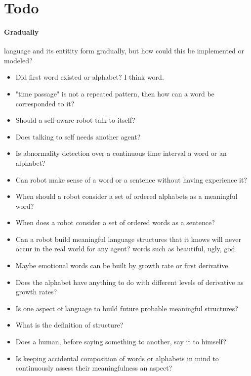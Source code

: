 \section{Todo}

    \paragraph{Gradually}
        language and its entitity form gradually, but how could this be implemented or modeled?


    \begin{itemize}
        \item Did first word existed or alphabet? I think word.
        \item "time passage" is not a repeated pattern, then how can a word be corresponded to it?
        \item Should a self-aware robot talk to itself?
        \item Does talking to self needs another agent?
        \item Is abnormality detection over a continuous time interval a word or an alphabet?
        \item Can robot make sense of a word or a sentence without having experience it?
        \item When should a robot consider a set of ordered alphabets as a meaningful word?
        \item When does a robot consider a set of ordered words as a sentence?
        \item Can a robot build meaningful language structures that it knows will never occur in the real world for any agent? words such as beautiful, ugly, god
        \item Maybe emotional words can be built by growth rate or first derivative.
        \item Does the alphabet have anything to do with different levels of derivative as growth rates?
        \item Is one aspect of language to build future probable meaningful structures?
        \item What is the definition of structure?
        \item Does a human, before saying something to another, say it to himself?
        \item Is keeping accidental composition of words or alphabets in mind to continuously assess their meaningfulness an aspect?

\end{itemize}
